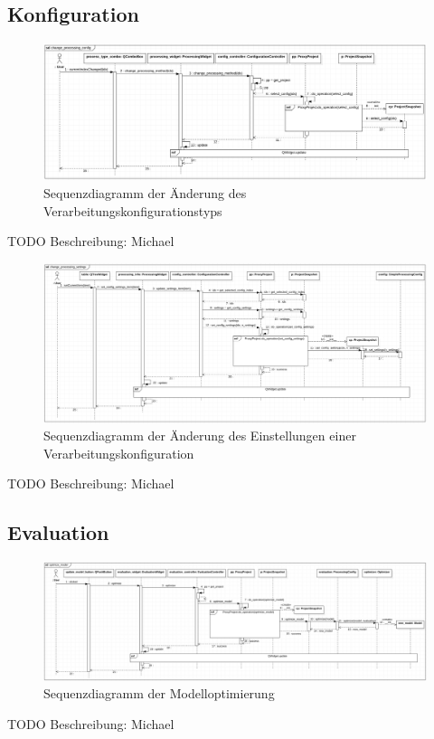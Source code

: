 \documentclass{article}
\begin{document}
\subsection{Konfiguration}
\begin{figure}[H]%
    \centering
    \includegraphics[width=13cm]{entwurf/Entwurf_dokument/img/Michael/sd_change_processing_config.png}
    \caption{Sequenzdiagramm der Änderung des Verarbeitungskonfigurationstyps}
\end{figure}
TODO Beschreibung: Michael

\begin{figure}[H]%
    \centering
    \includegraphics[width=13cm]{entwurf/Entwurf_dokument/img/Michael/sd_change_processing_settings.png}
    \caption{Sequenzdiagramm der Änderung des Einstellungen einer Verarbeitungskonfiguration}
\end{figure}
TODO Beschreibung: Michael


\subsection{Evaluation}

\begin{figure}[H]%
    \centering
    \includegraphics[width=13cm]{entwurf/Entwurf_dokument/img/Michael/sd_optimize_model.png}
    \caption{Sequenzdiagramm der Modelloptimierung}
\end{figure}
TODO Beschreibung: Michael
\end{document}
